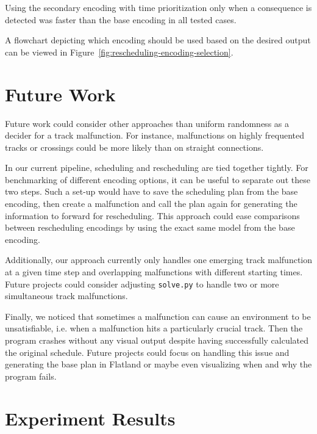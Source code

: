 \documentclass[runningheads]{llncs}
\begin{document}
Using the secondary encoding with time prioritization only when a consequence
is detected was faster than the base encoding in all tested cases.

A flowchart depicting which encoding should be used based on the desired output can be viewed in Figure~\ref{fig:rescheduling-encoding-selection}.

\section{Future Work}\label{future-work}
Future work could consider other approaches than uniform randomness as a decider for a track malfunction. For instance, malfunctions on highly frequented tracks or crossings could be more likely than on straight connections. 

In our current pipeline, scheduling and rescheduling are tied together tightly. For benchmarking of different encoding options, it can be useful to separate out these two steps. Such a set-up would have to save the scheduling plan from the base encoding, then create a malfunction and call the plan again for generating the information to forward for rescheduling. This approach could ease comparisons between rescheduling encodings by using the exact same model from the base encoding.

Additionally, our approach currently only handles one emerging track malfunction at a given time step and overlapping malfunctions with different starting times. Future projects could consider adjusting \verb|solve.py| to handle two or more simultaneous track malfunctions.

Finally, we noticed that sometimes a malfunction can cause an environment to be unsatisfiable, i.e. when a malfunction hits a particularly crucial track. Then the program crashes without any visual output despite having successfully calculated the original schedule. Future projects could focus on handling this issue and generating the base plan in Flatland or maybe even visualizing when and why the program fails.





\pagebreak
\appendix
\section{Experiment Results}
\label{sec:appendix}
\end{document}

